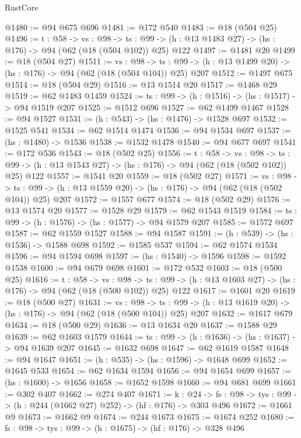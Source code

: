\begin{lexlean}{RustCore}
\begin{coremodule}
@1480 := @94 @675 @696
@1481 := @172 @540
@1483 := @18 (@504 @25)
@1496 := {t : @58} ->
  {vs : @98} ->
  {ts : @99} -> (h : @13 @1483 @27) -> (hs : @176) -> @94 (@62 (@18 (@504 @102)) @25) @122
@1497 := @1481 @20
@1499 := @18 (@504 @27)
@1511 := {vs : @98} ->
  {ts : @99} -> (h : @13 @1499 @20) -> (hs : @176) -> @94 (@62 (@18 (@504 @104)) @25) @207
@1512 := @1497 @675
@1514 := @18 (@504 @29)
@1516 := @13 @1514 @20
@1517 := @1468 @29
@1519 := @62 @1483 @1459
@1524 := {ts : @99} -> (h : @1516) -> (hs : @1517) -> @94 @1519 @207
@1525 := @1512 @696
@1527 := @62 @1499 @1467
@1528 := @94 @1527
@1531 := (h : @543) -> (hs : @1476) -> @1528 @697
@1532 := @1525 @541
@1534 := @62 @1514 @1474
@1536 := @94 @1534 @697
@1537 := (hs : @1480) -> @1536
@1538 := @1532 @1478
@1540 := @94 @677 @697
@1541 := @172 @536
@1543 := @18 (@502 @25)
@1556 := {t : @58} ->
  {vs : @98} ->
  {ts : @99} -> (h : @13 @1543 @27) -> (hs : @176) -> @94 (@62 (@18 (@502 @102)) @25) @122
@1557 := @1541 @20
@1559 := @18 (@502 @27)
@1571 := {vs : @98} ->
  {ts : @99} -> (h : @13 @1559 @20) -> (hs : @176) -> @94 (@62 (@18 (@502 @104)) @25) @207
@1572 := @1557 @677
@1574 := @18 (@502 @29)
@1576 := @13 @1574 @20
@1577 := @1528 @29
@1579 := @62 @1543 @1519
@1584 := {ts : @99} -> (h : @1576) -> (hs : @1577) -> @94 @1579 @207
@1585 := @1572 @697
@1587 := @62 @1559 @1527
@1588 := @94 @1587
@1591 := (h : @539) -> (hs : @1536) -> @1588 @698
@1592 := @1585 @537
@1594 := @62 @1574 @1534
@1596 := @94 @1594 @698
@1597 := (hs : @1540) -> @1596
@1598 := @1592 @1538
@1600 := @94 @679 @698
@1601 := @172 @532
@1603 := @18 (@500 @25)
@1616 := {t : @58} ->
  {vs : @98} ->
  {ts : @99} -> (h : @13 @1603 @27) -> (hs : @176) -> @94 (@62 (@18 (@500 @102)) @25) @122
@1617 := @1601 @20
@1619 := @18 (@500 @27)
@1631 := {vs : @98} ->
  {ts : @99} -> (h : @13 @1619 @20) -> (hs : @176) -> @94 (@62 (@18 (@500 @104)) @25) @207
@1632 := @1617 @679
@1634 := @18 (@500 @29)
@1636 := @13 @1634 @20
@1637 := @1588 @29
@1639 := @62 @1603 @1579
@1644 := {ts : @99} -> (h : @1636) -> (hs : @1637) -> @94 @1639 @207
@1645 := @1632 @698
@1647 := @62 @1619 @1587
@1648 := @94 @1647
@1651 := (h : @535) -> (hs : @1596) -> @1648 @699
@1652 := @1645 @533
@1654 := @62 @1634 @1594
@1656 := @94 @1654 @699
@1657 := (hs : @1600) -> @1656
@1658 := @1652 @1598
@1660 := @94 @681 @699
@1661 := @302 @407
@1662 := @274 @407
@1671 := {k : @24} ->
  {fs : @98} -> {tys : @99} -> (h : @244 (@1662 @27) @252) -> (hf : @176) -> @303 @496
@1672 := @1661 @9
@1673 := @1662 @9
@1674 := @244 @1673
@1675 := @1674 @252
@1680 := {fs : @98} -> {tys : @99} -> (h : @1675) -> (hf : @176) -> @328 @496

\end{coremodule}
\end{lexlean}
